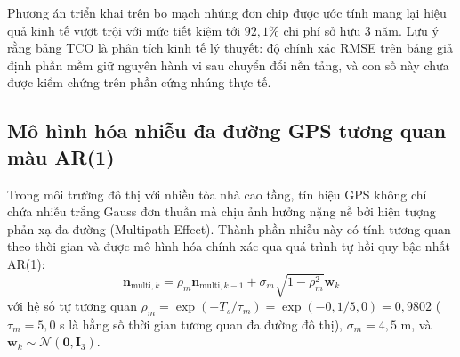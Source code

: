 Phương án triển khai trên bo mạch nhúng đơn chip được ước tính mang lại hiệu quả kinh tế vượt trội với mức tiết kiệm tới $92{,}1\%$ chi phí sở hữu 3 năm. Lưu ý rằng bảng TCO là phân tích kinh tế lý thuyết: độ chính xác RMSE trên bảng giả định phần mềm giữ nguyên hành vi sau chuyển đổi nền tảng, và con số này chưa được kiểm chứng trên phần cứng nhúng thực tế.

\subsection{Mô hình hóa nhiễu đa đường GPS tương quan màu AR(1)}

\hspace{0.5cm} Trong môi trường đô thị với nhiều tòa nhà cao tầng, tín hiệu GPS không chỉ chứa nhiễu trắng Gauss đơn thuần mà chịu ảnh hưởng nặng nề bởi hiện tượng phản xạ đa đường (Multipath Effect). Thành phần nhiễu này có tính tương quan theo thời gian và được mô hình hóa chính xác qua quá trình tự hồi quy bậc nhất AR(1):
\begin{equation}
\mathbf{n}_{\text{multi}, k} = \rho_m \mathbf{n}_{\text{multi}, k-1} + \sigma_m \sqrt{1 - \rho_m^2} \mathbf{w}_k
\label{eq:multipath-ar1-equation}
\end{equation}
với hệ số tự tương quan $\rho_m = \exp(-T_s / \tau_m) = \exp(-0{,}1 / 5{,}0) = 0{,}9802$ ($\tau_m = 5{,}0$ s là hằng số thời gian tương quan đa đường đô thị), $\sigma_m = 4{,}5$ m, và $\mathbf{w}_k \sim \mathcal{N}(\mathbf{0}, \mathbf{I}_3)$.

\begin{table}[H]
\centering
\caption{Đo đạc khả năng dập tắt nhiễu đa đường tương quan màu AR(1) của các bộ lọc}
\label{tab:multipath-filter-performance}
\end{table}


